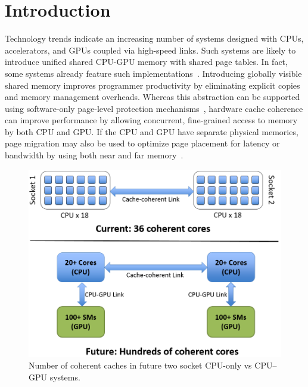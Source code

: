 \section{Introduction}
\label{introduction}

Technology trends indicate an increasing number of systems designed with CPUs, 
accelerators, and GPUs coupled via high-speed 
links. Such systems are likely to introduce unified shared
CPU-GPU memory with shared page tables. In fact, some systems already
feature such implementations~\cite{AMDKaveri}.
Introducing globally visible shared memory
improves programmer productivity by eliminating explicit copies and memory 
management overheads. Whereas this abstraction can be supported using
software-only page-level protection mechanisms~\cite{UVM, HSA}, hardware cache coherence 
can improve performance by allowing concurrent, fine-grained access to memory
by both CPU and GPU.  If the CPU and GPU have separate physical
memories, page migration may also be used to optimize page placement for
latency or bandwidth by using both near and far 
memory~\cite{Dashti2013,Agarwal2015b,Meswani2015,Chou2015}.

\begin{figure}[t]
\centering
\includegraphics[width=0.9\columnwidth]{figures/coherent_cores.png}
\caption{Number of coherent caches in future two socket CPU-only vs CPU--GPU 
systems.}

\label{fig:motivation}
\end{figure}

